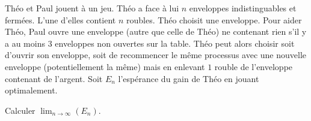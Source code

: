 Théo et Paul jouent à un jeu. Théo a face à lui $n$ enveloppes indistinguables et fermées. L'une d'elles contient $n$ roubles. Théo choisit une enveloppe. Pour aider Théo, Paul ouvre une enveloppe (autre que celle de Théo) ne contenant rien s'il y a au moins $3$ enveloppes non ouvertes sur la table. Théo peut alors choisir soit d'ouvrir son enveloppe, soit de recommencer le même processus avec une nouvelle enveloppe (potentiellement la même) mais en enlevant $1$ rouble de l'enveloppe contenant de l'argent. Soit $E_n$ l'espérance du gain de Théo en jouant optimalement.

Calculer $\lim_{n\to \infty}(E_n)$.